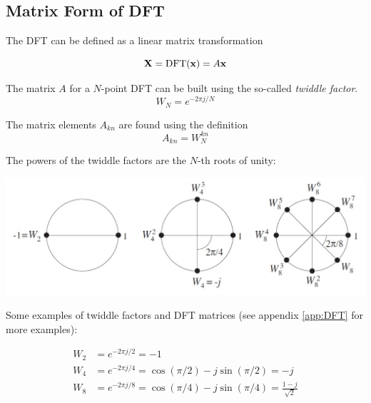 \subsection{Matrix Form of DFT}
The DFT can be defined as a linear matrix transformation

\begin{equation*}
	\mathbf{X} = \operatorname{\text{DFT}}(\mathbf{x}) = A \mathbf{x}
\end{equation*}

The matrix $A$ for a $N$-point DFT can be built using the so-called
\emph{twiddle factor}.
\begin{equation*}
	W_N = e^{-2 \pi j / N}
\end{equation*}

The matrix elements $A_{kn}$ are found using the definition
\begin{equation*}
	A_{kn} = W_N^{kn}
\end{equation*}

The powers of the twiddle factors are the $N$-th roots of unity:
\begin{center}
	\includegraphics[width=0.9\linewidth]{images/DFT_FFT_WN.jpg}
\end{center}

Some examples of twiddle factors and DFT matrices (see appendix
\ref{app:DFT} for more examples):

\begin{align*}
	W_2 &= e^{-2\pi j / 2} = -1 \\
	W_4 &= e^{-2\pi j / 4} = \cos(\pi/2) - j\sin(\pi/2) = -j \\
	W_8 &= e^{-2\pi j / 8} = \cos(\pi/4) - j\sin(\pi/4) = \frac{1-j}{\sqrt{2}}
\end{align*}

